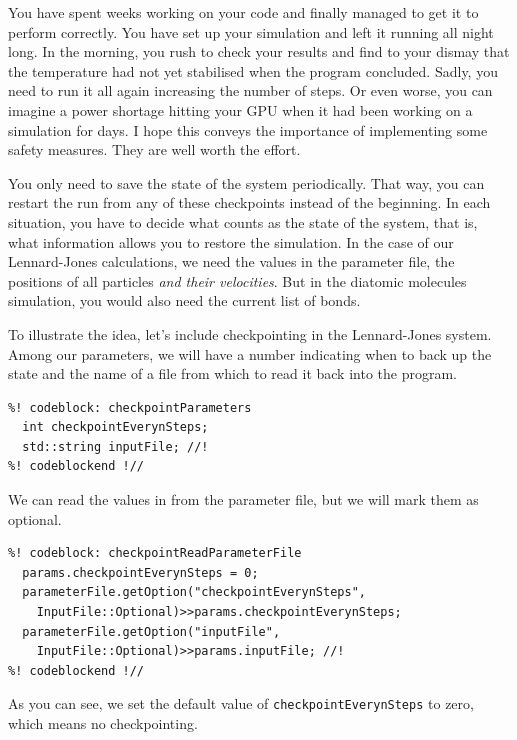 You have spent weeks working on your code and finally managed to get it to 
perform correctly. You have set up your simulation and left it running all night 
long. In the morning, you rush to check your results and find to your dismay 
that the temperature had not yet stabilised when the program concluded. Sadly, 
you need to run it all again increasing the number of steps. Or even worse, you 
can imagine a power shortage hitting your GPU when it had been working on a 
simulation for days. I hope this conveys the importance of implementing some 
safety measures. They are well worth the effort.

You only need to save the state of the system periodically. That way, you can 
restart the run from any of these checkpoints instead of the beginning. In each 
situation, you have to decide what counts as the state of the system, that is, 
what information allows you to restore the simulation. In the case of our 
Lennard-Jones calculations, we need the values in the parameter file, the 
positions of all particles \textit{and their velocities}. But in the diatomic 
molecules simulation, you would also need the current list of bonds.

To illustrate the idea, let's include checkpointing in the Lennard-Jones system.
Among our parameters, we will have a number indicating when to back up the 
state and the name of a file from which to read it back into the program.
\begin{lstlisting}
%! codeblock: checkpointParameters
  int checkpointEverynSteps;
  std::string inputFile; //!
%! codeblockend !//
\end{lstlisting}
We can read the values in from the parameter file, but we will mark them as 
optional.
\begin{lstlisting}
%! codeblock: checkpointReadParameterFile
  params.checkpointEverynSteps = 0;
  parameterFile.getOption("checkpointEverynSteps",
    InputFile::Optional)>>params.checkpointEverynSteps;
  parameterFile.getOption("inputFile",
    InputFile::Optional)>>params.inputFile; //!
%! codeblockend !//
\end{lstlisting}
As you can see, we set the default value of \texttt{checkpointEverynSteps} to 
zero, which means no checkpointing.

